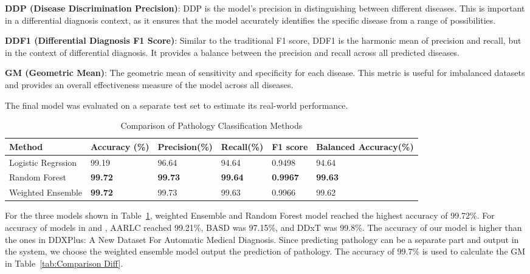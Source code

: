 \documentclass{article}
\begin{document}
\textbf{DDP (Disease Discrimination Precision)}: DDP is the model's precision in distinguishing between different diseases. This is important in a differential diagnosis context, as it ensures that the model accurately identifies the specific disease from a range of possibilities.

\textbf{DDF1 (Differential Diagnosis F1 Score)}: Similar to the traditional F1 score, DDF1 is the harmonic mean of precision and recall, but in the context of differential diagnosis. It provides a balance between the precision and recall across all predicted diseases.

\textbf{GM (Geometric Mean)}: The geometric mean of sensitivity and specificity for each disease. This metric is useful for imbalanced datasets and provides an overall effectiveness measure of the model across all diseases.

The final model was evaluated on a separate test set to estimate its real-world performance.

\begin{table}[h]
\caption{Comparison of Pathology Classification Methods}
\begin{tabular}{ p{2cm}p{2cm} p{2cm}p{2cm}p{2cm}p{2cm} }
 \hline
 \textbf{Method}  & \textbf{Accuracy (\%)}& \textbf{Precision(\%)}&\textbf{Recall(\%)} & \textbf{F1 score}& \textbf{Balanced Accuracy(\%)}\\
 \hline
 Logistic Regrssion & 99.19 & 96.64 & 94.64 & 0.9498 & 94.64\\
 \hline
 Random Forest   & \textbf{99.72}&\textbf{99.73}&   \textbf{99.64}& \textbf{0.9967}& \textbf{99.63}\\
 \hline
 Weighted Ensemble   & \textbf{99.72}   & 99.73&   99.63& 0.9966& 99.62\\
 \hline
\end{tabular}
\label{tab:Classification Path}
\end{table}

For the three models shown in Table~\ref{tab:Classification Path}, weighted Ensemble and Random Forest model reached the highest accuracy of  99.72\%. For accuracy of models in \parencite{Fansi_2022} and \parencite{Alam_2023}, AARLC reached 99.21\%, BASD was 97.15\%, and DDxT was 99.8\%. The accuracy of our model is higher than the ones in  DDXPlus: A New Dataset For Automatic Medical Diagnosis. Since predicting pathology can be a separate part and output in the system, we choose the weighted ensemble model output the prediction of pathology. The accuracy of 99.7\% is used to calculate the GM in Table~\ref{tab:Comparison Diff}.
\end{document}
